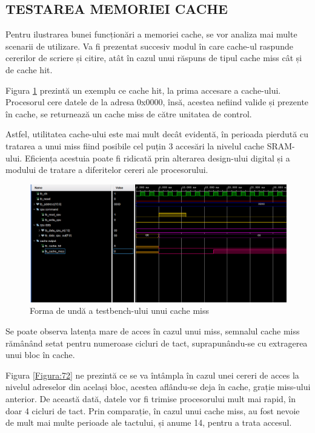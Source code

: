 \documentclass[12pt]{article}
\begin{document}
 \subsection{TESTAREA MEMORIEI CACHE}
 Pentru ilustrarea bunei funcționări a memoriei cache, se vor analiza mai multe scenarii de utilizare. Va fi prezentat succesiv modul în care cache-ul raspunde cererilor de scriere și citire, atât în cazul unui răspuns de tipul cache miss cât și de cache hit.
 

 Figura \ref{Figura:71} prezintă un exemplu ce cache hit, la prima accesare a cache-ului. Procesorul cere datele de la adresa 0x0000, însă, acestea nefiind valide și prezente în cache, se returnează un cache miss de către 
unitatea de control.

Astfel, utilitatea cache-ului este mai mult decât evidentă, în perioada pierdută cu tratarea a unui miss fiind posibile cel puțin 3 accesări la nivelul cache SRAM-ului. Eficiența acestuia poate fi ridicată prin alterarea design-ului digital și a modului de tratare a diferitelor cereri ale procesorului.

  \begin{figure}[h!]
 \hspace*{-0.4cm}\includegraphics[width=1\textwidth]{cachemiss1.png}
 \centering
 \caption{Forma de undă a testbench-ului unui cache miss}
 \label{Figura:71}
 \end{figure}
 
Se poate observa latența mare de acces în cazul unui miss, semnalul cache miss rămânând setat pentru numeroase cicluri de tact, suprapunându-se cu extragerea unui bloc în cache.

 Figura \ref{Figura:72} ne prezintă ce se va întâmpla în cazul unei cereri de acces la nivelul adreselor din același bloc, acestea aflându-se deja în cache, grație miss-ului anterior. De această dată, datele vor fi trimise procesorului mult mai rapid, în doar 4 cicluri de tact. Prin comparație, în cazul unui cache miss, au fost nevoie de mult mai multe perioade ale tactului, și anume 14, pentru a trata accesul.
 
\end{document}
